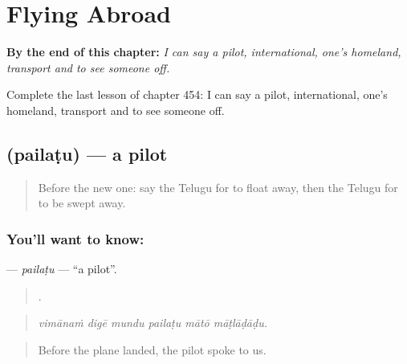 
\chapter{Flying Abroad}
\label{ch:te-flying-abroad}

\begin{chapteropening}
\textbf{By the end of this chapter:} \emph{I can say a pilot, international, one's homeland, transport and to see someone off.}

Complete the last lesson of chapter 454: I can say a pilot, international, one's homeland, transport and to see someone off.
\end{chapteropening}

\section[\texorpdfstring{\te{పైలటు} (pailaṭu)}{పైలటు (pailaṭu)}]{ (pailaṭu) — a pilot}

\label{lesson:TE-C454-pailatu}



\begin{quote}
Before the new one: say the Telugu for to float away, then the Telugu for to be swept away.
\end{quote}

\subsection*{You'll want to know: }
\textbf{} — \emph{pailaṭu} — \textquotedblleft{}a pilot\textquotedblright{}.

\begin{quote}
     .
\end{quote}

\begin{quote}
\emph{vimānaṁ digē mundu pailaṭu mātō māṭlāḍāḍu.}
\end{quote}

\begin{quote}
Before the plane landed, the pilot spoke to us.
\end{quote}

